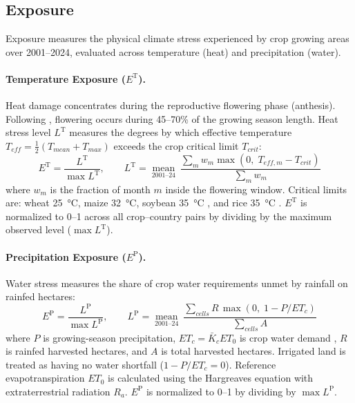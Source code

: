 \documentclass[11pt,a4paper]{article}
\let\parencite\citep
\let\textcite\citet
\newcommand{\TT}{\mathrm{T}}   %
\newcommand{\PP}{\mathrm{P}}   %
\begin{document}
\subsection{Exposure}
Exposure measures the physical climate stress experienced by crop growing areas over 2001--2024, evaluated across temperature (heat) and precipitation (water).

\paragraph{Temperature Exposure ($E^{\TT}$).} Heat damage concentrates during the reproductive flowering phase (anthesis). Following \textcite{deryng2014}, flowering occurs during 45--70\% of the growing season length. Heat stress level $L^{\TT}$ measures the degrees by which effective temperature $T_{eff} = \tfrac12(T_{mean}+T_{max})$ exceeds the crop critical limit $T_{crit}$:
\begin{equation}
E^{\TT} = \frac{L^{\TT}}{\max L^{\TT}},\qquad L^{\TT} = \operatorname*{mean}_{2001\text{--}24}\ \frac{\sum_m w_m \max(0,\; T_{eff,m} - T_{crit})}{\sum_m w_m}
\end{equation}
where $w_m$ is the fraction of month $m$ inside the flowering window. Critical limits are: wheat \SI{25}{\celsius}, maize \SI{32}{\celsius}, soybean \SI{35}{\celsius} \parencite{deryng2014}, and rice \SI{35}{\celsius} \parencite{yoshida1981,fao66}. $E^{\TT}$ is normalized to 0--1 across all crop--country pairs by dividing by the maximum observed level ($\max L^{\TT}$).

\paragraph{Precipitation Exposure ($E^{\PP}$).} Water stress measures the share of crop water requirements unmet by rainfall on rainfed hectares:
\begin{equation}
E^{\PP} = \frac{L^{\PP}}{\max L^{\PP}},\qquad L^{\PP} = \operatorname*{mean}_{2001\text{--}24}\ \frac{\sum_{cells} R\,\max(0,\; 1 - P/ET_c)}{\sum_{cells} A}
\end{equation}
where $P$ is growing-season precipitation, $ET_c = \bar{K}_c ET_0$ is crop water demand \parencite{fao56}, $R$ is rainfed harvested hectares, and $A$ is total harvested hectares. Irrigated land is treated as having no water shortfall ($1 - P/ET_c = 0$). Reference evapotranspiration $ET_0$ is calculated using the Hargreaves equation \parencite[FAO-56 Eq.~52]{fao56} with extraterrestrial radiation $R_a$. $E^{\PP}$ is normalized to 0--1 by dividing by $\max L^{\PP}$.
\end{document}

